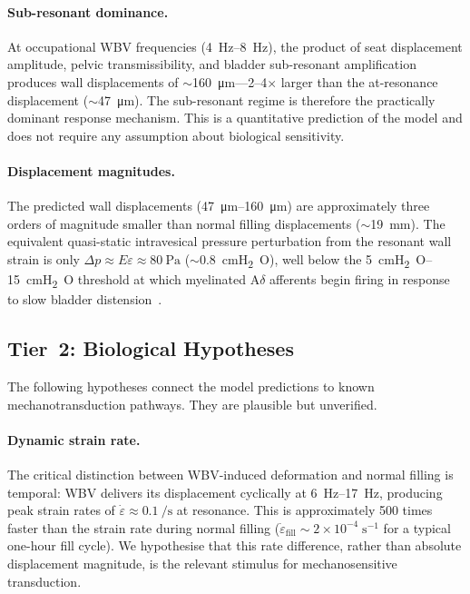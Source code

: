 \paragraph{Sub-resonant dominance.}
At occupational WBV frequencies (\SIrange{4}{8}{\hertz}), the product of
seat displacement amplitude, pelvic transmissibility, and bladder
sub-resonant amplification produces wall displacements of
$\sim$\SI{160}{\micro\metre}---2--4$\times$ larger than the at-resonance
displacement ($\sim$\SI{47}{\micro\metre}).  The sub-resonant regime is
therefore the practically dominant response mechanism.  This is a
quantitative prediction of the model and does not require any assumption
about biological sensitivity.

\paragraph{Displacement magnitudes.}
The predicted wall displacements (\SIrange{47}{160}{\micro\metre}) are
approximately three orders of magnitude smaller than normal filling
displacements ($\sim$\SI{19}{\milli\metre}).  The equivalent quasi-static
intravesical pressure perturbation from the resonant wall strain is only
$\Delta p \approx E\varepsilon \approx \SI{80}{\pascal}$
($\sim$\SI{0.8}{cmH_2O}), well below the \SIrange{5}{15}{cmH_2O}
threshold at which myelinated A$\delta$ afferents begin firing in response
to slow bladder distension~\cite{Habler1993,Fowler2008}.


\subsection{Tier~2: Biological Hypotheses}
\label{sec:bio_hypotheses}

The following hypotheses connect the model predictions to known
mechanotransduction pathways.  They are plausible but unverified.

\paragraph{Dynamic strain rate.}
The critical distinction between WBV-induced deformation and normal filling
is temporal: WBV delivers its displacement cyclically at
\SIrange{6}{17}{\hertz}, producing peak strain rates of
$\dot{\varepsilon} \approx \SI{0.1}{\per\second}$ at resonance.  This is
approximately 500 times faster than the strain rate during normal filling
($\dot{\varepsilon}_\mathrm{fill} \sim 2 \times 10^{-4}\;\mathrm{s}^{-1}$
for a typical one-hour fill cycle).  We hypothesise that this rate
difference, rather than absolute displacement magnitude, is the relevant
stimulus for mechanosensitive transduction.

